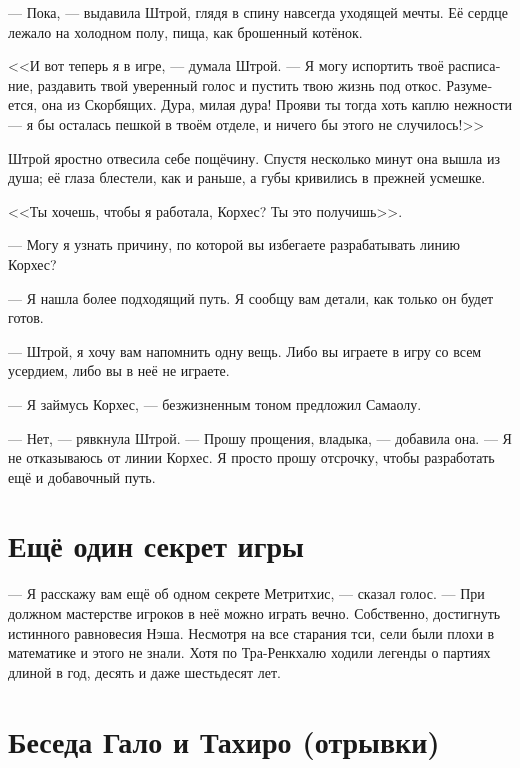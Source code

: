 \documentclass[a4paper,12pt,fleqn]{book}\usepackage{polyglossia}\setdefaultlanguage[babelshorthands=true]{russian}\setotherlanguage{english}\defaultfontfeatures{Ligatures=TeX,Mapping=tex-text}\usepackage{xcolor}\newcommand{\ml}[3]{#2}
\newcommand{\asterism}{\vspace{1em}{\centering\Large\bfseries$\ast~\ast~\ast$\par}\vspace{1em}}
\begin{document}
{--- Пока, --- выдавила Штрой, глядя в спину навсегда уходящей мечты.
Её сердце лежало на холодном полу, пища, как брошенный котёнок.

<<И вот теперь я в игре, --- думала Штрой.
\ml{$0-[ej]$}
{--- Я могу испортить твоё расписание, раздавить твой уверенный голос и пустить твою жизнь под откос.}
{I can rewrite your schedule, crush your confident voice, and derail your life.}
Разумеется, она из Скорбящих.
\ml{$0-[ej]$}
{Дура, милая дура!}
{Fool, you precious fool!}
\ml{$0-[ej]$}
{Прояви ты тогда хоть каплю нежности --- я бы осталась пешкой в твоём отделе, и ничего бы этого не случилось!>>}
{If you could be a little gentle to me, I'd stay a pawn in your sector, and none of that would ever happen!''}

Штрой яростно отвесила себе пощёчину.
Спустя несколько минут она вышла из душа;
её глаза блестели, как и раньше, а губы кривились в прежней усмешке.

<<Ты хочешь, чтобы я работала, Корхес?
Ты это получишь>>.

\asterism

--- Могу я узнать причину, по которой вы избегаете разрабатывать линию Корхес?

--- Я нашла более подходящий путь.
Я сообщу вам детали, как только он будет готов.

--- Штрой, я хочу вам напомнить одну вещь.
Либо вы играете в игру со всем усердием, либо вы в неё не играете.

--- Я займусь Корхес, --- безжизненным тоном предложил Самаолу.

--- Нет, --- рявкнула Штрой.
--- Прошу прощения, владыка, --- добавила она.
--- Я не отказываюсь от линии Корхес.
Я просто прошу отсрочку, чтобы разработать ещё и добавочный путь.

\section{Ещё один секрет игры}

--- Я расскажу вам ещё об одном секрете Метритхис, --- сказал голос.
--- При должном мастерстве игроков в неё можно играть вечно.
Собственно, достигнуть истинного равновесия Нэша.
Несмотря на все старания тси, сели были плохи в математике и этого не знали.
Хотя по Тра-Ренкхалю ходили легенды о партиях длиной в год, десять и даже шестьдесят лет.

\section{Беседа Гало и Тахиро (отрывки)}

}
\end{document}
